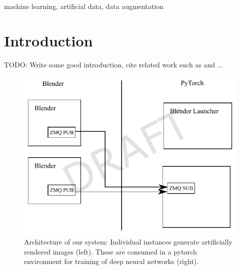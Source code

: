 \documentclass[conference]{IEEEtran}
\begin{document}
\begin{IEEEkeywords}
machine learning, artificial data, data augmentation
\end{IEEEkeywords}

\section{Introduction}

TODO: Write some good introduction, cite related work such as \cite{2017_Varhegyi_visualServoingRGBD} and \cite{2017_Johnson_DrivingInTheMatrix}...

\begin{figure}[htbp]
\centerline{\includegraphics[width=\columnwidth]{figures/architecture/architecture.pdf}}
\caption{\label{fig:architecture} Architecture of our system: Individual instances generate artificially rendered images (left). These are consumed in a pytorch environment for training of deep neural networks (right).}
\label{fig}
\end{figure}
\end{document}
